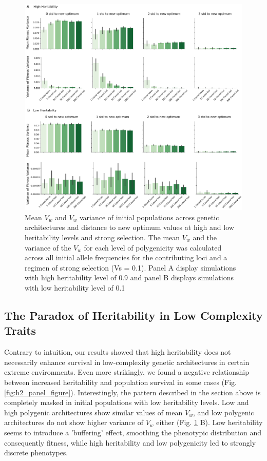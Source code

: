 \documentclass{article}
\begin{document}
\begin{figure}[H]
  \centering
  \includegraphics[width=1\textwidth]{figures/mean_var_of_fitness_var_ipop_sel0.1.pdf}
  \caption{Mean $V_w$ and $V_w$ variance of initial populations across genetic architectures and distance to new optimum values at high and low heritability levels and strong selection. The mean $V_w$ and the variance of the $V_w$ for each level of polygenicity was calculated across all initial allele frequencies for the contributing loci and a regimen of strong selection (Vs = 0.1). Panel A display simulations with high heritability level of 0.9 and panel B displays simulations with low heritability level of 0.1}
  \label{fig:initial_pop_meanandvar_fitvar}
\end{figure}

\subsection{The Paradox of Heritability in Low Complexity Traits}
Contrary to intuition, our results showed that high heritability does not necessarily enhance survival in low-complexity genetic architectures in certain extreme environments. Even more strikingly, we found a negative relationship between increased heritability and population survival in some cases (Fig. \ref{fig:h2_panel_figure}). Interestingly, the pattern described in the section above is completely masked in initial populations with low heritability levels. Low and high polygenic architectures show similar values of mean $V_w$, and low polygenic architectures do not show higher variance of $V_w$ either (Fig. \ref{fig:initial_pop_meanandvar_fitvar} B). Low heritability seems to introduce a 'buffering' effect, smoothing the phenotypic distribution and consequently fitness, while high heritability and low polygenicity led to strongly discrete phenotypes. 
\end{document}
